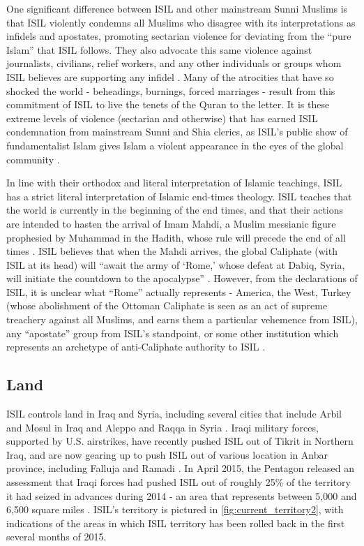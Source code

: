 \documentclass{report}
\begin{document}
    One significant difference between ISIL and other mainstream Sunni Muslims is that ISIL violently condemns all Muslims who disagree with its interpretations as infidels and apostates, promoting  sectarian violence for deviating from the \enquote{pure Islam} that ISIL follows. They also advocate this same violence against journalists, civilians, relief workers, and any other individuals or groups whom ISIL believes are supporting any infidel \cite{Wood2015,Hassan2015,AustralianNationalSecurityAttorney-GeneralsDepartment2014}. Many of the atrocities that have so shocked the world - beheadings, burnings, forced marriages - result from this commitment of ISIL to live the tenets of the Quran to the letter. It is these extreme levels of  violence (sectarian and otherwise) that has earned ISIL condemnation from mainstream Sunni and Shia clerics, as ISIL's public show of fundamentalist Islam gives Islam a violent appearance in the eyes of the global community \cite{Mandhai2014}.
    
    In line with their  orthodox and literal interpretation of Islamic teachings, ISIL  has a strict literal interpretation of Islamic  end-times theology. ISIL teaches that the world is currently in the beginning of the end times, and that their actions are intended to hasten the arrival of Imam Mahdi, a Muslim messianic figure prophesied by Muhammad in the Hadith, whose rule will precede the end of all times \cite{arabi2008divine,Wood2015}. ISIL believes that when the Mahdi arrives, the global Caliphate (with ISIL at its head)  will \enquote{await the army of \enquote{Rome,} whose defeat at Dabiq, Syria, will initiate the countdown to the apocalypse} \cite{Wood2015}. However, from the declarations of ISIL, it is unclear what \enquote{Rome} actually represents - America, the West, Turkey (whose abolishment of the Ottoman Caliphate is seen as an act of supreme treachery against all Muslims, and earns them a particular vehemence from ISIL), any \enquote{apostate} group from ISIL's standpoint, or some other institution which represents an archetype of anti-Caliphate authority to ISIL \cite{Mortada2014,Wood2015}. 
    
    
    


\subsection{Land}

ISIL controls land in Iraq and Syria, including several cities that include Arbil and Mosul in Iraq and Aleppo and Raqqa in Syria \cite{McFate2015}.  Iraqi military forces, supported by U.S. airstrikes, have recently pushed ISIL out of Tikrit in Northern Iraq, and are now gearing up to push ISIL out of various location in Anbar province, including Falluja and Ramadi \cite{Nordland2015}.  In April 2015, the Pentagon released an assessment that Iraqi forces had pushed ISIL out of roughly 25\% of the territory it had seized in advances during 2014 - an area that represents between 5,000 and 6,500 square miles \cite{Michaels2015}.  ISIL's territory is pictured in \autoref{fig:current_territory2}, with indications of the areas in which ISIL territory has been rolled back in the first several months of 2015. 
\end{document}
